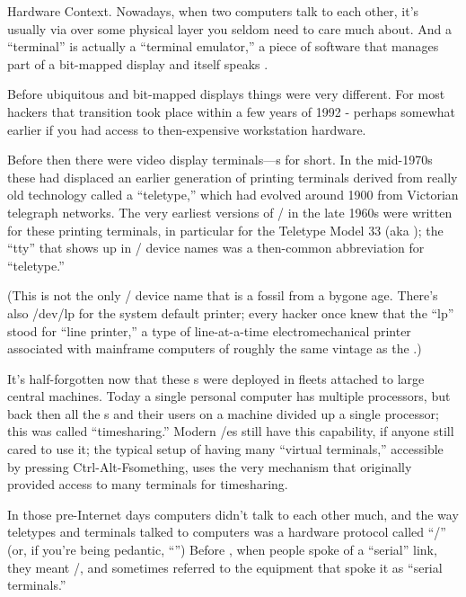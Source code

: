 \sect Hardware Context.
Nowadays, when two computers talk to each other, it's usually via  over
some physical layer you seldom need to care much about. And a ``terminal'' is
actually a ``terminal emulator,'' a piece of software that manages part of a
bit-mapped display and itself speaks .

Before ubiquitous  and bit-mapped displays things were very different.
For most hackers that transition took place within a few years of 1992 -
perhaps somewhat earlier if you had access to then-expensive workstation
hardware.

Before then there were video display terminals---s for short. In the
mid-1970s these had displaced an earlier generation of printing terminals
derived from really old technology called a ``teletype,'' which had evolved
around 1900 from Victorian telegraph networks. The very earliest versions of
\UNIX/ in the late 1960s were written for these printing terminals, in particular
for the Teletype Model 33 (aka ); the ``tty'' that shows up in \UNIX/ device
names was a then-common abbreviation for ``teletype.''

(This is not the only \UNIX/ device name that is a fossil from a bygone age.
There's also /dev/lp for the system default printer; every hacker once knew
that the ``lp'' stood for ``line printer,'' a type of line-at-a-time
electromechanical printer associated with mainframe computers of roughly the
same vintage as the .)

It's half-forgotten now that these s were deployed in fleets attached to
large central machines. Today a single personal computer has multiple
processors, but back then all the s and their users on a machine divided up
a single processor; this was called ``timesharing.'' Modern \UNIX/es still have
this capability, if anyone still cared to use it; the typical setup of having
many ``virtual terminals,'' accessible by pressing Ctrl-Alt-Fsomething, uses the
very mechanism that originally provided access to many terminals for
timesharing.

In those pre-Internet days computers didn't talk to each other much, and the
way teletypes and terminals talked to computers was a hardware protocol called
``\RSTTT/'' (or, if you're being pedantic, ``'')  Before , when
people spoke of a ``serial'' link, they meant \RSTTT/, and sometimes referred to
the equipment that spoke it as ``serial terminals.''

